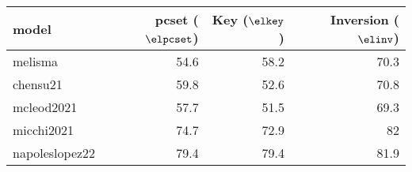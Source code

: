 \begin{tabular}{l|rrr}
model          & \gls{pcset} ($\elpcset$) & Key ($\elkey$) & Inversion ($\elinv$)  \\ \hline
melisma        & 54.6 & 58.2 & 70.3 \\
chensu21       & 59.8 & 52.6 & 70.8 \\
mcleod2021     & 57.7 & 51.5 & 69.3 \\
micchi2021     & 74.7 & 72.9 & 82   \\
napoleslopez22 & 79.4 & 79.4 & 81.9
\end{tabular}
